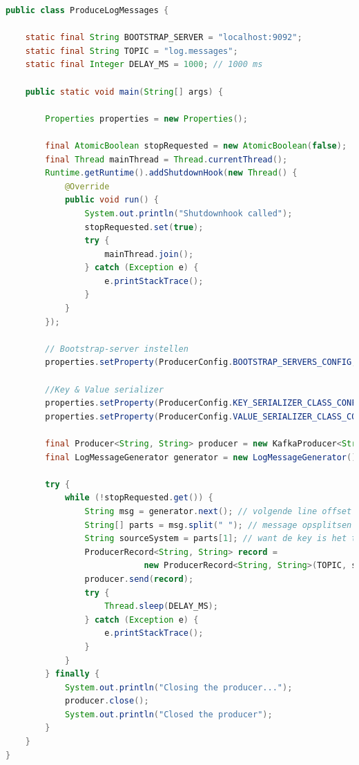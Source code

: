 \documentclass[a4paper,10pt,twoside]{report}
\begin{document}
\begin{lstlisting}[language=Java]
public class ProduceLogMessages {
	
	static final String BOOTSTRAP_SERVER = "localhost:9092";
	static final String TOPIC = "log.messages";
	static final Integer DELAY_MS = 1000; // 1000 ms
	
	public static void main(String[] args) {
		
		Properties properties = new Properties();
		
		final AtomicBoolean stopRequested = new AtomicBoolean(false);
		final Thread mainThread = Thread.currentThread();
		Runtime.getRuntime().addShutdownHook(new Thread() {
			@Override
			public void run() {
				System.out.println("Shutdownhook called");
				stopRequested.set(true);
				try {
					mainThread.join();
				} catch (Exception e) {
					e.printStackTrace();
				}
			}
		});
		
		// Bootstrap-server instellen
		properties.setProperty(ProducerConfig.BOOTSTRAP_SERVERS_CONFIG, BOOTSTRAP_SERVER);
		
		//Key & Value serializer
		properties.setProperty(ProducerConfig.KEY_SERIALIZER_CLASS_CONFIG, StringSerializer.class.getName());
		properties.setProperty(ProducerConfig.VALUE_SERIALIZER_CLASS_CONFIG, StringSerializer.class.getName());
		
		final Producer<String, String> producer = new KafkaProducer<String, String>(properties);
		final LogMessageGenerator generator = new LogMessageGenerator();
		
		try {
			while (!stopRequested.get()) {
				String msg = generator.next(); // volgende line offset in een bestand
				String[] parts = msg.split(" "); // message opsplitsen in een array
				String sourceSystem = parts[1]; // want de key is het tweede element in de string
				ProducerRecord<String, String> record = 
							new ProducerRecord<String, String>(TOPIC, sourceSystem, msg);
				producer.send(record); 
				try {
					Thread.sleep(DELAY_MS);
				} catch (Exception e) {
					e.printStackTrace();
				}
			}
		} finally {
			System.out.println("Closing the producer...");
			producer.close();
			System.out.println("Closed the producer");
		}
	}	
}
\end{lstlisting}

\newpage
\end{document}
